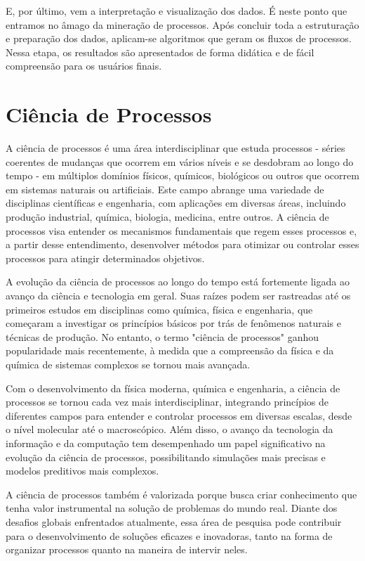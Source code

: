 \documentclass[tcc2]{classe_uftex/uftex}
\begin{document}
E, por último, vem a interpretação e visualização dos dados. É neste ponto que entramos no âmago da mineração de processos. Após concluir toda a estruturação e preparação dos dados, aplicam-se algoritmos que geram os fluxos de processos. Nessa etapa, os resultados são apresentados de forma didática e de fácil compreensão para os usuários finais.\cite{marban2009data}


\section{Ciência de Processos}

A ciência de processos é uma área interdisciplinar que estuda processos - séries coerentes de mudanças que ocorrem em vários níveis e se desdobram ao longo do tempo - em múltiplos domínios \cite{vom2021process} físicos, químicos, biológicos ou outros que ocorrem em sistemas naturais ou artificiais. Este campo abrange uma variedade de disciplinas científicas e engenharia, com aplicações em diversas áreas, incluindo produção industrial, química, biologia, medicina, entre outros. A ciência de processos visa entender os mecanismos fundamentais que regem esses processos e, a partir desse entendimento, desenvolver métodos para otimizar ou controlar esses processos para atingir determinados objetivos.

A evolução da ciência de processos ao longo do tempo está fortemente ligada ao avanço da ciência e tecnologia em geral. Suas raízes podem ser rastreadas até os primeiros estudos em disciplinas como química, física e engenharia, que começaram a investigar os princípios básicos por trás de fenômenos naturais e técnicas de produção. No entanto, o termo "ciência de processos" ganhou popularidade mais recentemente, à medida que a compreensão da física e da química de sistemas complexos se tornou mais avançada.

Com o desenvolvimento da física moderna, química e engenharia, a ciência de processos se tornou cada vez mais interdisciplinar, integrando princípios de diferentes campos para entender e controlar processos em diversas escalas, desde o nível molecular até o macroscópico. Além disso, o avanço da tecnologia da informação e da computação tem desempenhado um papel significativo na evolução da ciência de processos, possibilitando simulações mais precisas e modelos preditivos mais complexos.

A ciência de processos também é valorizada porque busca criar conhecimento que tenha valor instrumental na solução de problemas do mundo real. Diante dos desafios globais enfrentados atualmente, essa área de pesquisa pode contribuir para o desenvolvimento de soluções eficazes e inovadoras, tanto na forma de organizar processos quanto na maneira de intervir neles.
\end{document}
